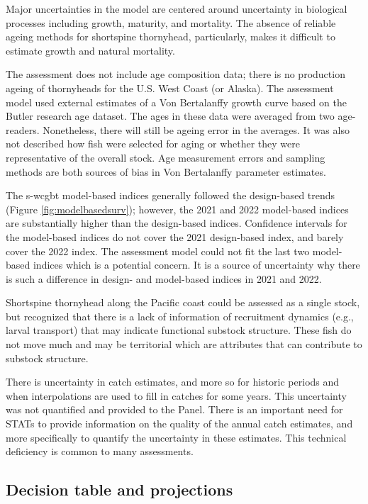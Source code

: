 \documentclass[11pt,
  letterpaper,
]{article}
\begin{document}
Major uncertainties in the model are centered around uncertainty in biological processes including growth, maturity, and mortality. The absence of reliable ageing methods for shortspine thornyhead, particularly, makes it difficult to estimate growth and natural mortality.

The assessment does not include age composition data; there is no production ageing of thornyheads for the U.S. West Coast (or Alaska). The assessment model used external estimates of a Von Bertalanffy growth curve based on the Butler research age dataset. The ages in these data were averaged from two age-readers. Nonetheless, there will still be ageing error in the averages. It was also not described how fish were selected for aging or whether they were representative of the overall stock. Age measurement errors and sampling methods are both sources of bias in Von Bertalanffy parameter estimates.

The \gls{s-wcgbt} model-based indices generally followed the design-based trends (Figure \ref{fig:modelbasedsurv}); however, the 2021 and 2022 model-based indices are substantially higher than the design-based indices. Confidence intervals for the model-based indices do not cover the 2021 design-based index, and barely cover the 2022 index. The assessment model could not fit the last two model-based indices which is a potential concern. It is a source of uncertainty why there is such a difference in design- and model-based indices in 2021 and 2022.

Shortspine thornyhead along the Pacific coast could be assessed as a single stock, but recognized that there is a lack of information of recruitment dynamics (e.g., larval transport) that may indicate functional substock structure. These fish do not move much and may be territorial which are attributes that can contribute to substock structure.

There is uncertainty in catch estimates, and more so for historic periods and when interpolations are used to fill in catches for some years. This uncertainty was not quantified and provided to the Panel. There is an important need for STATs to provide information on the quality of the annual catch estimates, and more specifically to quantify the uncertainty in these estimates. This technical deficiency is common to many assessments.

\hypertarget{decision-table-and-projections}{%
\subsection*{Decision table and projections}\label{decision-table-and-projections}}
\end{document}
